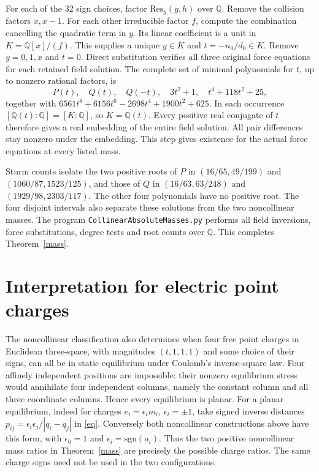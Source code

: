 \documentclass[11pt]{article}
\newcommand{\Q}{\mathbb Q}
\begin{document}
For each of the 32 sign choices, factor $\mathrm{Res}_y(g,h)$ over $\Q$. Remove the collision factors $x,x-1$. For each other irreducible factor $f$, compute the combination cancelling the quadratic term in $y$. Its linear coefficient is a unit in $K=\Q[x]/(f)$. This supplies a unique $y\in K$ and $t=-n_0/d_0\in K$. Remove $y=0,1,x$ and $t=0$. Direct substitution verifies all three original force equations for each retained field solution. The complete set of minimal polynomials for $t$, up to nonzero rational factors, is
\[
 P(t),\quad Q(t),\quad Q(-t),\quad 3t^2+1,\quad t^4+118t^2+25,
\]
together with $6561t^8+6156t^6-2698t^4+1900t^2+625$. In each occurrence $[\Q(t):\Q]=[K:\Q]$, so $K=\Q(t)$. Every positive real conjugate of $t$ therefore gives a real embedding of the entire field solution. All pair differences stay nonzero under the embedding. This step gives existence for the actual force equations at every listed mass.

Sturm counts isolate the two positive roots of $P$ in $(16/65,49/199)$ and $(1060/87,1523/125)$, and those of $Q$ in $(16/63,63/248)$ and $(1929/98,2303/117)$. The other four polynomials have no positive root. The four disjoint intervals also separate these solutions from the two noncollinear masses. The program \texttt{CollinearAbsoluteMasses.py} performs all field inversions, force substitutions, degree tests and root counts over $\Q$. This completes Theorem~\ref{mass}.

\section{Interpretation for electric point charges}
The noncollinear classification also determines when four free point charges in Euclidean three-space, with magnitudes $(t,1,1,1)$ and some choice of their signs, can all be in static equilibrium under Coulomb's inverse-square law. Four affinely independent positions are impossible: their nonzero equilibrium stress would annihilate four independent columns, namely the constant column and all three coordinate columns. Hence every equilibrium is planar. For a planar equilibrium, indeed for charges $e_i=\epsilon_i m_i$, $\epsilon_i=\pm1$, take signed inverse distances $p_{ij}=\epsilon_i\epsilon_j/|q_i-q_j|$ in \eqref{eq}. Conversely both noncollinear constructions above have this form, with $\epsilon_0=1$ and $\epsilon_i=\mathrm{sgn}(a_i)$. Thus the two positive noncollinear mass ratios in Theorem~\ref{mass} are precisely the possible charge ratios. The same charge signs need not be used in the two configurations.
\end{document}
